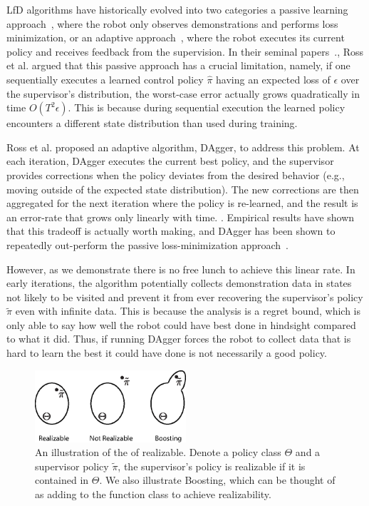\documentclass[10pt, conference]{ieeeconf}      %
\begin{document}
LfD algorithms have historically evolved into two categories a passive learning approach~\cite{pomerleau1989alvinn}, where the robot only observes demonstrations and performs loss minimization, or an adaptive approach~\cite{ross2010reduction}, where the robot executes its current policy and receives feedback from the supervision. In their seminal papers~\cite{ross2010efficient,ross2010reduction,ross2013learning}., Ross et al. argued that this passive approach has a crucial limitation, namely,  if one sequentially executes a learned control policy $\hat{\pi}$ having an expected loss of $\epsilon$ over the supervisor's distribution, the worst-case error actually grows quadratically in time $O(T^2\epsilon)$. This is because during sequential execution the learned policy encounters a different state distribution than used during training.

Ross et al. proposed an adaptive algorithm, DAgger, to address this problem.  At each iteration, DAgger executes the current best policy, and the supervisor provides corrections when the policy deviates from the desired behavior (e.g., moving outside of the expected state distribution). The new corrections are then aggregated for the next iteration where the policy is re-learned, and the result is an error-rate that grows only linearly with time. . Empirical results have shown that this tradeoff is actually worth making,  and DAgger has been shown to repeatedly out-perform the passive loss-minimization approach~\cite{ross2010efficient,ross2010reduction,ross2013learning}.

However, as we demonstrate there is no free lunch to achieve this linear rate. In early iterations, the algorithm potentially collects demonstration data in states not likely to be visited and prevent it from ever  recovering the supervisor's policy $\tilde{\pi}$ even with infinite data. This is because the analysis is a regret bound, which is only able to say how well the robot could have best done in hindsight compared to what it did. Thus, if running DAgger forces the robot to collect data that is hard to learn the best it could have done is not necessarily a good policy. 


\begin{figure}
\includegraphics[width=0.5\textwidth]{f_figs/realizibility.eps}
\caption{
    \footnotesize
An illustration of the  of realizable. Denote a policy class $\Theta$ and a supervisor policy $\tilde{\pi}$, the supervisor's policy is realizable if it is contained in $\Theta$. We also illustrate Boosting, which can be thought of as adding to the function class to achieve realizability.}
\vspace*{-20pt}
\label{fig:teaserl}
\end{figure}
\end{document}

